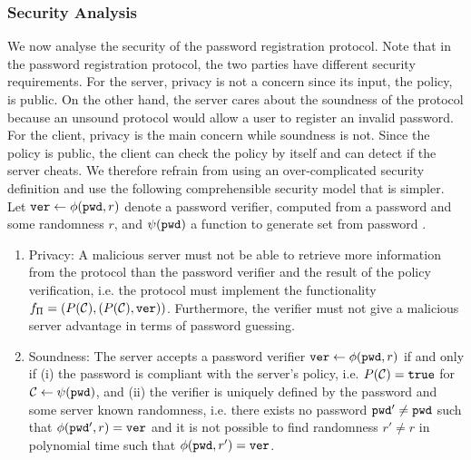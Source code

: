 \subsubsection{Security Analysis} \label{sec:bpr:security}
We now analyse the security of the password registration protocol. Note that in the password registration protocol, the two parties have different security requirements. For the server, privacy is not a concern since its input, the policy, is public. On the other hand, the server cares about the soundness of the protocol because an unsound protocol would allow a user to register an invalid password. For the client, privacy is the main concern while soundness is not. Since the policy is public, the client can check the policy by itself and can detect if the server cheats. 
We therefore refrain from using an over-complicated security definition and use the following comprehensible security model that is simpler. Let $\mathtt{ver}\gets\phi(\mathtt{pwd},r)$ denote a password verifier, computed from a password \pwd and some randomness $r$, and $\psi(\mathtt{pwd})$ a function to generate set \cC from password \pwd.
\begin{enumerate}
  \item Privacy: A malicious server must not be able to retrieve more information from the protocol than the password verifier and the result of the policy verification, i.e. the protocol must implement the functionality $f_{\Pi}=(P(\mathcal{C}), (P(\mathcal{C}), \mathtt{ver}))$. Furthermore, the verifier must not give a malicious server advantage in terms of password guessing. 
  \item Soundness: The server accepts a password verifier $\mathtt{ver}\gets\phi(\mathtt{pwd},r)$ if and only if (i) the password is compliant with the server's policy, i.e. $P(\mathcal{C})=\mathtt{true}$ for $\mathcal{C}\gets\psi(\mathtt{pwd})$, and (ii) the verifier is uniquely defined by the password and some server known randomness, i.e. there exists no password $\mathtt{pwd}'\not=\mathtt{pwd}$ such that $\phi(\mathtt{pwd}',r)=\mathtt{ver}$ and it is not possible to find randomness $r'\not=r$ in polynomial time such that $\phi(\mathtt{pwd},r')=\mathtt{ver}$.
\end{enumerate}


